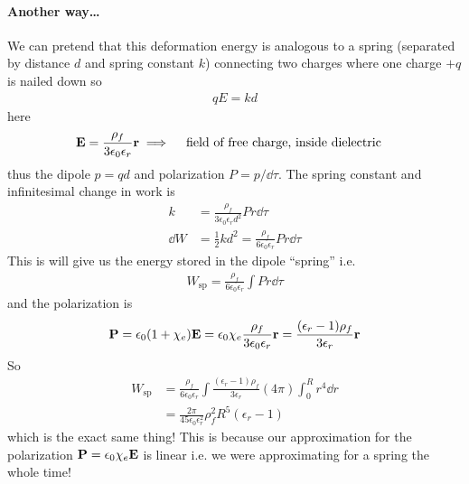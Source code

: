 \documentclass[../main.tex]{subfiles}
\begin{document}
\paragraph{Another way\dots}
We can pretend that this deformation energy is analogous to a spring (separated by distance $d$ and spring constant $k$)
connecting two charges where one charge $+q$ is nailed down so 
\begin{align*}
    qE = kd
\end{align*}
here
\begin{align*}
    \vb E = \frac{\rho_f}{3\epsilon_0 \epsilon_r} \vb r \implies \qqtext{field of free charge, inside dielectric}
\end{align*}
thus the dipole $p = qd$ and polarization $P = p/ \dd{\tau}$. The spring constant and infinitesimal change in work is
\begin{align*}
    k &= \frac{\rho_f}{3\epsilon_0 \epsilon_r d^2} P r \dd{\tau} \\
    \dd{W} &= \frac{1}{2} kd^2 = \frac{\rho_f}{6\epsilon_0 \epsilon_r} P r \dd{\tau}
\end{align*}
This is will give us the energy stored in the dipole ``spring'' i.e.
\begin{align*}
    W_\text{sp} = \frac{\rho_f}{6\epsilon_0 \epsilon_r} \int P r \dd{\tau} 
\end{align*}
and the polarization is
\begin{align*}
    \vb P = \epsilon_0 (1 + \chi_e) \vb E = \epsilon_0 \chi_e \frac{\rho_f}{3\epsilon_0 \epsilon_r} \vb r = \frac{(\epsilon_r - 1) \rho_f}{3\epsilon_r} \vb r
\end{align*}
So
\begin{align*}
    W_\text{sp} &= \frac{\rho_f}{6\epsilon_0 \epsilon_r} \int \frac{(\epsilon_r - 1) \rho_f}{3\epsilon_r} (4\pi) \int_0^R r^4 \dd{r}  \\
    &= \frac{2\pi}{45\epsilon_0 \epsilon_r^2} \rho_f^2 R^5 (\epsilon_r - 1)
\end{align*}
which is the exact same thing! This is because our approximation for the polarization $\vb P = \epsilon_0 \chi_e \vb E$ is linear i.e. we were approximating for a spring the whole time!
\end{document}
